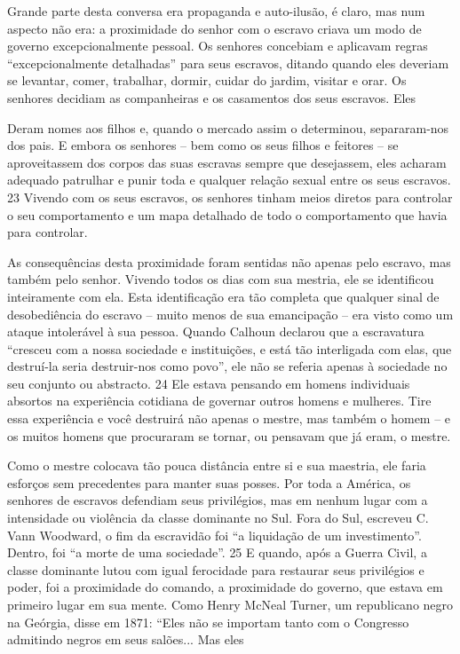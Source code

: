  \par 
Grande parte desta conversa era propaganda e auto-ilusão, é claro, mas num aspecto não era: a proximidade do senhor com o escravo criava um modo de governo excepcionalmente pessoal. Os senhores concebiam e aplicavam regras “excepcionalmente detalhadas” para seus escravos, ditando quando eles deveriam se levantar, comer, trabalhar, dormir, cuidar do jardim, visitar e orar. Os senhores decidiam as companheiras e os casamentos dos seus escravos. Eles
 \par 
Deram nomes aos filhos e, quando o mercado assim o determinou, separaram-nos dos pais. E embora os senhores – bem como os seus filhos e feitores – se aproveitassem dos corpos das suas escravas sempre que desejassem, eles acharam adequado patrulhar e punir toda e qualquer relação sexual entre os seus escravos. {\color{blue}23} Vivendo com os seus escravos, os senhores tinham meios diretos para controlar o seu comportamento e um mapa detalhado de todo o comportamento que havia para controlar.
 \par 
As consequências desta proximidade foram sentidas não apenas pelo escravo, mas também pelo senhor. Vivendo todos os dias com sua mestria, ele se identificou inteiramente com ela. Esta identificação era tão completa que qualquer sinal de desobediência do escravo – muito menos de sua emancipação – era visto como um ataque intolerável à sua pessoa. Quando Calhoun declarou que a escravatura “cresceu com a nossa sociedade e instituições, e está tão interligada com elas, que destruí-la seria destruir-nos como povo”, ele não se referia apenas à sociedade no seu conjunto ou abstracto. {\color{blue}24} Ele estava pensando em homens individuais absortos na experiência cotidiana de governar outros homens e mulheres. Tire essa experiência e você destruirá não apenas o mestre, mas também o homem – e os muitos homens que procuraram se tornar, ou pensavam que já eram, o mestre.
 \par 
Como o mestre colocava tão pouca distância entre si e sua maestria, ele faria esforços sem precedentes para manter suas posses. Por toda a América, os senhores de escravos defendiam seus privilégios, mas em nenhum lugar com a intensidade ou violência da classe dominante no Sul. Fora do Sul, escreveu C. Vann Woodward, o fim da escravidão foi “a liquidação de um investimento”. Dentro, foi “a morte de uma sociedade”. {\color{blue}25} E quando, após a Guerra Civil, a classe dominante lutou com igual ferocidade para restaurar seus privilégios e poder, foi a proximidade do comando, a proximidade do governo, que estava em primeiro lugar em sua mente. Como Henry McNeal Turner, um republicano negro na Geórgia, disse em 1871: “Eles não se importam tanto com o Congresso admitindo negros em seus salões... Mas eles
